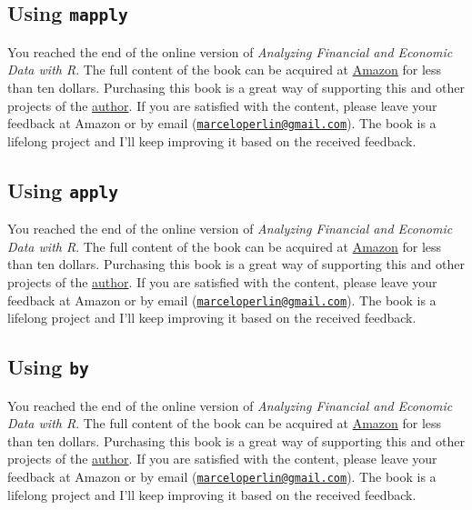 \documentclass[
  12pt,
]{book}
\newenvironment{pleasebuyit}
{\begin{noteblock}
		
	} {\end{noteblock}}
\begin{document}
\hypertarget{using-mapply}{%
\subsection{\texorpdfstring{Using \texttt{mapply}}{Using mapply}}\label{using-mapply}}

\begin{pleasebuyit}
You reached the end of the online version of \emph{Analyzing Financial
and Economic Data with R}. The full content of the book can be acquired
at \href{https://www.amazon.com/dp/B084LSNXMN}{Amazon} for less than ten
dollars. Purchasing this book is a great way of supporting this and
other projects of the \href{https://www.msperlin.com/blog/}{author}. If
you are satisfied with the content, please leave your feedback at Amazon
or by email
(\href{mailto:marceloperlin@gmail.com}{\nolinkurl{marceloperlin@gmail.com}}).
The book is a lifelong project and I'll keep improving it based on the
received feedback.
\end{pleasebuyit}

\hypertarget{using-apply}{%
\subsection{\texorpdfstring{Using \texttt{apply}}{Using apply}}\label{using-apply}}

\begin{pleasebuyit}
You reached the end of the online version of \emph{Analyzing Financial
and Economic Data with R}. The full content of the book can be acquired
at \href{https://www.amazon.com/dp/B084LSNXMN}{Amazon} for less than ten
dollars. Purchasing this book is a great way of supporting this and
other projects of the \href{https://www.msperlin.com/blog/}{author}. If
you are satisfied with the content, please leave your feedback at Amazon
or by email
(\href{mailto:marceloperlin@gmail.com}{\nolinkurl{marceloperlin@gmail.com}}).
The book is a lifelong project and I'll keep improving it based on the
received feedback.
\end{pleasebuyit}

\hypertarget{using-by}{%
\subsection{\texorpdfstring{Using \texttt{by}}{Using by}}\label{using-by}}

\begin{pleasebuyit}
You reached the end of the online version of \emph{Analyzing Financial
and Economic Data with R}. The full content of the book can be acquired
at \href{https://www.amazon.com/dp/B084LSNXMN}{Amazon} for less than ten
dollars. Purchasing this book is a great way of supporting this and
other projects of the \href{https://www.msperlin.com/blog/}{author}. If
you are satisfied with the content, please leave your feedback at Amazon
or by email
(\href{mailto:marceloperlin@gmail.com}{\nolinkurl{marceloperlin@gmail.com}}).
The book is a lifelong project and I'll keep improving it based on the
received feedback.
\end{pleasebuyit}
\end{document}

